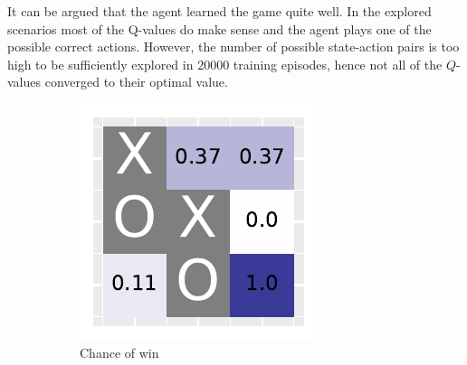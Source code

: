 \documentclass[10pt]{IEEEtran}
\begin{document}
It can be argued that the agent learned the game quite well. In the explored scenarios most of the Q-values do make sense and the agent plays one of the possible correct actions. However, the number of possible state-action pairs is too high to be sufficiently explored in $20000$ training episodes, hence not all of the $Q$-values converged to their optimal value. 

\begin{figure}[h]
     \centering
     \begin{subfigure}[t]{0.32\linewidth}
         \centering
         \includegraphics[width=\linewidth]{code/figures/heatmap_0.pdf}
         \caption{Chance of win}
         \label{fig_heatmap_1}
     \end{subfigure}
     \hfill
     \begin{subfigure}[t]{0.32\linewidth}
         \centering

\end{subfigure}
\end{figure}
\end{document}
